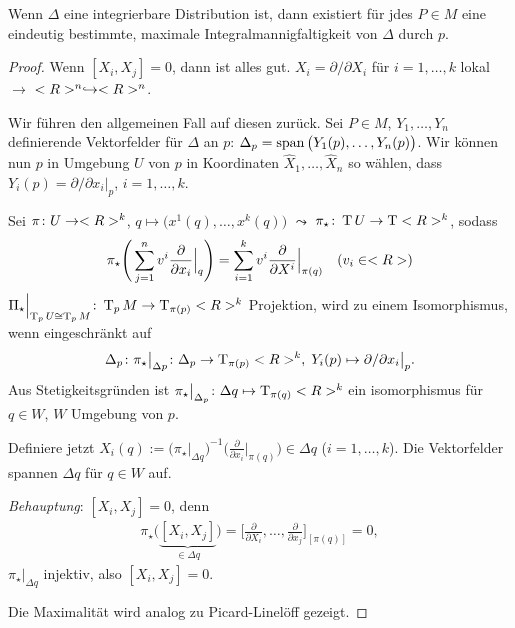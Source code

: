 \begin{proposition}[Frobenius]
	Wenn $\Delta$ eine integrierbare Distribution ist, dann existiert für jdes $P\in M$ eine eindeutig bestimmte, maximale Integralmannigfaltigkeit von $\Delta$ durch $p$.
\end{proposition}
\begin{proof}
	Wenn $[X_i,X_j]=0$, dann ist alles gut. $X_i = \partial \slash\partial X_i$ für $i=1,\dots,k$ lokal $\rightarrow$ $<R>^n\hookrightarrow <R>^n$.
	
	Wir führen den allgemeinen Fall auf diesen zurück. Sei $P\in M$, $Y_1,\dots,Y_n$ definierende Vektorfelder für $\Delta$ an $p$: $\Delta_p = \operatorname{span}\big(Y_1(p),\dots,Y_n(p)\big)$. Wir können nun $p$ in Umgebung $U$ von $p$ in Koordinaten $\hat X_1,\dots,\hat X_n$ so wählen, dass $Y_i(p) = \partial\slash\partial x_i\Big|_p$, $i=1,\dots,k$.
	
	Sei $\pi\colon U\to<R>^k$, $q\mapsto \big(x^1(q),\dots,x^k(q)\big)$ $\leadsto$ $\pi_\star\colon\operatorname{T} U\to\operatorname{T} <R>^k$, sodass \begin{align*}
		 \pi_\star\Bigg(\sum_{j=1}^n v^i\frac{\partial}{\partial x_i}\Big|_q\Bigg) = \sum_{i=1}^k v^i \frac{\partial}{\partial X^i}\Big|_{\pi(q)}\quad(v_i\in<R>)
	\end{align*}
	$\Pi_\star\Big|_{\operatorname{T}_p U\cong \operatorname{T}_p M}\colon \operatorname{T}_p M\to \operatorname{T}_{\pi(p)} <R>^k$ Projektion, wird zu einem Isomorphismus, wenn eingeschränkt auf \begin{align*}
		\Delta_p\colon \pi_\star\big|_{\Delta p}\colon\Delta_p\to \operatorname{T}_{\pi(p)} <R>^k,\;Y_i(p)\mapsto \partial\slash\partial x_i\big|_p.
	\end{align*}
	Aus Stetigkeitsgründen ist $\pi_\star\big|_{\Delta_p}\colon\Delta q\mapsto \operatorname{T}_{\pi(q)} <R>^k$ ein isomorphismus für $q\in W$, $W$ Umgebung von $p$.
	
	Definiere jetzt $X_i(q) := \Big(\pi_\star\big|_{\Delta q}\Big)^{-1}\Big(\frac{\partial}{\partial x_i}\Big|_{\pi(q)}\Big)\in\Delta q$ ($i=1,\dots,k$). Die Vektorfelder spannen $\Delta q$ für $q\in W$ auf.
	
	\emph{Behauptung}: $[X_i,X_j]=0$, denn \begin{align*}
		\pi_\star\Big(\underbrace{[X_i,X_j]}_{\in\Delta q}\Big)=\Big[\frac{\partial}{\partial X_i},\dots,\frac{\partial}{\partial x_j}\Big]_[\pi(q)] = 0,
	\end{align*}
	$\pi_\star\big|_{\Delta q}$ injektiv, also $[X_i,X_j] = 0$.
	
	Die Maximalität wird analog zu Picard-Linelöff gezeigt.
\end{proof}